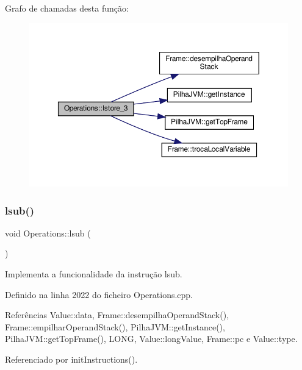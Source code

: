 Grafo de chamadas desta função\+:\nopagebreak
\begin{figure}[H]
\begin{center}
\leavevmode
\includegraphics[width=350pt]{classOperations_a00d5ca7ea5a68e9cccfdc26b11a716bf_cgraph}
\end{center}
\end{figure}
\mbox{\label{classOperations_a32485b21761b1e5540a6575822a2661a}} 
\subsubsection{\texorpdfstring{lsub()}{lsub()}}
{\footnotesize\ttfamily void Operations\+::lsub (\begin{DoxyParamCaption}{ }\end{DoxyParamCaption})\hspace{0.3cm}{\ttfamily [private]}}



Implementa a funcionalidade da instrução lsub. 



Definido na linha 2022 do ficheiro Operations.\+cpp.



Referências Value\+::data, Frame\+::desempilha\+Operand\+Stack(), Frame\+::empilhar\+Operand\+Stack(), Pilha\+J\+V\+M\+::get\+Instance(), Pilha\+J\+V\+M\+::get\+Top\+Frame(), L\+O\+NG, Value\+::long\+Value, Frame\+::pc e Value\+::type.



Referenciado por init\+Instructions().

